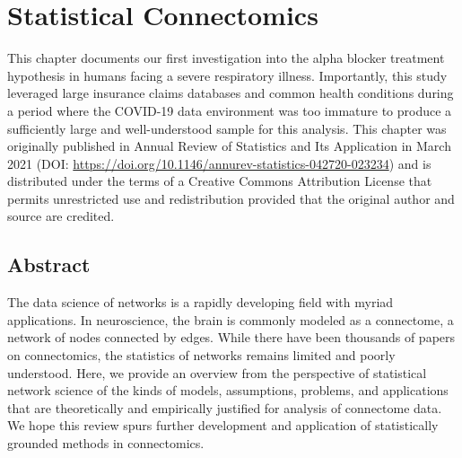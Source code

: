 \chapter{Statistical Connectomics} \label{chap:chap-3}

This chapter documents our first investigation into the alpha blocker treatment hypothesis in humans facing a severe respiratory illness. Importantly, this study leveraged large insurance claims databases and common health conditions during a period where the COVID-19 data environment was too immature to produce a sufficiently large and well-understood sample for this analysis. This chapter was originally published in Annual Review of Statistics and Its Application in March 2021 (DOI: \url{https://doi.org/10.1146/annurev-statistics-042720-023234}) and is distributed under the terms of a Creative Commons Attribution License that permits unrestricted use and redistribution provided that the original author and source are credited.

\pagebreak
\section*{Abstract}
The data science of networks is a rapidly developing field with myriad applications.  In neuroscience, the brain is commonly modeled as a connectome, a network of nodes connected by edges. While there have been thousands of papers on connectomics, the statistics of networks remains limited and poorly understood.  Here, we provide an overview from the perspective of statistical network science of the kinds of models, assumptions, problems, and applications that are theoretically and empirically justified for analysis of connectome data.  We hope this review spurs further development and application of statistically grounded methods in connectomics.
\pagebreak







